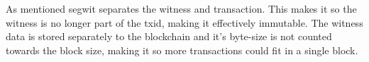 As mentioned segwit separates the witness and transaction. This makes it so the witness is no longer part of the txid, making it effectively immutable. The witness data is stored separately to the blockchain and it's byte-size is not counted towards the block size, making it so more transactions could fit in a single block. 